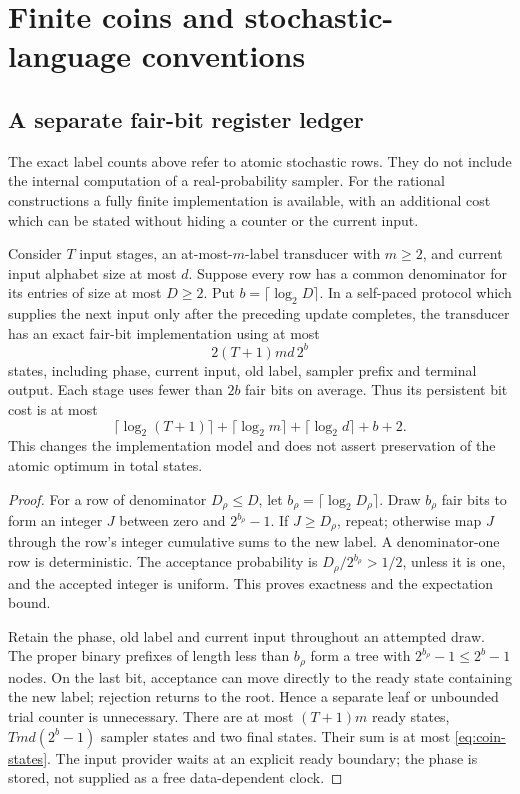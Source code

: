 \section{Finite coins and stochastic-language conventions}
\label{sec:implementation}
\subsection{A separate fair-bit register ledger}
The exact label counts above refer to atomic stochastic rows. They do
not include the internal computation of a real-probability sampler. For
the rational constructions a fully finite implementation is available,
with an additional cost which can be stated without hiding a counter
or the current input.

\begin{proposition}
\label{prop:finite-coins}
Consider $T$ input stages, an at-most-$m$-label transducer with $m\ge2$,
and current input alphabet size at most $d$. Suppose every row has a
common denominator for its entries of size at most $D\ge2$. Put
$b=\lceil\log_2D\rceil$. In a self-paced protocol which supplies the
next input only after the preceding update completes, the transducer
has an exact fair-bit implementation using at most
\begin{equation}\label{eq:coin-states}
                2(T+1)md\,2^b
\end{equation}
states, including phase, current input, old label, sampler prefix and
terminal output. Each stage uses fewer than $2b$ fair bits on average.
Thus its persistent bit cost is at most
\[
 \lceil\log_2(T+1)\rceil+\lceil\log_2m\rceil+
 \lceil\log_2d\rceil+b+2.
\]
This changes the implementation model and does not assert preservation
of the atomic optimum in total states.
\end{proposition}
\begin{proof}
For a row of denominator $D_\rho\le D$, let
$b_\rho=\lceil\log_2D_\rho\rceil$. Draw $b_\rho$ fair bits to form
an integer $J$ between zero and $2^{b_\rho}-1$. If $J\ge D_\rho$,
repeat; otherwise map $J$ through the row's integer cumulative sums to
the new label. A denominator-one row is deterministic. The acceptance
probability is $D_\rho/2^{b_\rho}>1/2$, unless it is one, and the
accepted integer is uniform. This proves exactness and the expectation
bound.

Retain the phase, old label and current input throughout an attempted
draw. The proper binary prefixes of length less than $b_\rho$ form a
tree with $2^{b_\rho}-1\le2^b-1$ nodes. On the last bit, acceptance
can move directly to the ready state containing the new label;
rejection returns to the root. Hence a separate leaf or unbounded trial
counter is unnecessary. There are at most $(T+1)m$ ready states,
$Tmd(2^b-1)$ sampler states and two final states. Their sum is at most
\eqref{eq:coin-states}. The input provider waits at an explicit ready
boundary; the phase is stored, not supplied as a free data-dependent
clock.
\end{proof}

